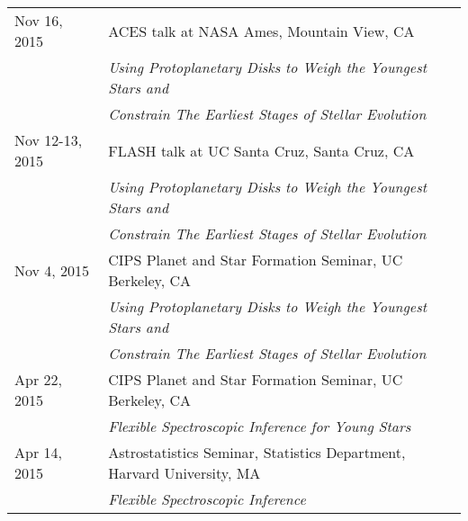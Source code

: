 \begin{longtable}{@{\hspace{10pt}}p{1.2in}l}
  Nov 16, 2015 & ACES talk at NASA Ames, Mountain View, CA \\
  & \emph{Using Protoplanetary Disks to Weigh the Youngest Stars and} \\
  & \emph{Constrain The Earliest Stages of Stellar Evolution} \\[\rowskip]
  Nov 12-13, 2015 & FLASH talk at UC Santa Cruz, Santa Cruz, CA \\
  & \emph{Using Protoplanetary Disks to Weigh the Youngest Stars and} \\
  & \emph{Constrain The Earliest Stages of Stellar Evolution} \\[\rowskip]
  Nov 4, 2015 & CIPS Planet and Star Formation Seminar, UC Berkeley, CA\\
  & \emph{Using Protoplanetary Disks to Weigh the Youngest Stars and} \\
  & \emph{Constrain The Earliest Stages of Stellar Evolution} \\[\rowskip]
  Apr 22, 2015 & CIPS Planet and Star Formation Seminar, UC Berkeley, CA\\
  & \emph{Flexible Spectroscopic Inference for Young Stars} \\[\rowskip]
  Apr 14, 2015 & Astrostatistics Seminar, Statistics Department, Harvard University, MA \\
  & \emph{Flexible Spectroscopic Inference} \\[\rowskip]
\end{longtable}
